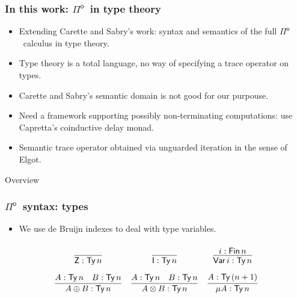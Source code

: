 \documentclass[12pt,t]{beamer}
\newcommand{\Pio}{\ensuremath{\mathsf{\Pi}^{\mathsf{o}}}}
\newcommand{\Ty}{\mathsf{Ty}}
\newcommand{\Var}{\mathsf{Var}}
\newcommand{\Z}{\mathsf{Z}}
\newcommand{\I}{\mathsf{I}}
\begin{document}
\begin{frame}
  
  \frametitle{In this work: \Pio\ in type theory}

  \begin{itemize}
  \item Extending Carette and Sabry's work: syntax and semantics of
    the full \Pio\ calculus in type theory.
  \item Type theory is a total language, no way of specifying a trace
    operator on types.
  \item Carette and Sabry's semantic domain is not good for our
    purpouse.
    \pause
    \vspace{\fill}
  \item Need a framework supporting possibly non-terminating
    computations: use Capretta's coinductive delay monad.
   \item Semantic trace operator obtained via unguarded iteration in
     the sense of Elgot.
  \end{itemize}
  
\end{frame}

\begin{frame}{Overview}

\end{frame}


\begin{frame}
  
  \frametitle{\Pio\ syntax: types}
  \begin{itemize}
    \item We use de Bruijn indexes to deal with type variables.
  \end{itemize}
  \[
  \arraycolsep=6pt\def\arraystretch{2.8}
  \begin{array}{ccc}
    \infer{\Z : \Ty\,n}{} 
    & \infer{\I : \Ty\,n}{}
    & \infer{\Var\,i : \Ty\,n}{i : \mathsf{Fin}\,n}  \\
    \infer{A \oplus B : \Ty\,n}{A : \Ty\,n & B : \Ty\,n}
    & \infer{A \otimes B : \Ty\,n}{A : \Ty\,n & B : \Ty\,n}
    & \infer{\mu A : \Ty\,n}{A : \Ty\,(n+1)}
  \end{array}
  \]
  
\end{frame}
\end{document}
